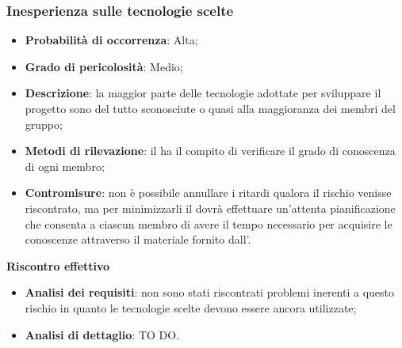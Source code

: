 		\subsubsection{Inesperienza sulle tecnologie scelte} %
		\label{ssub:inesperienza_sulle_tecnlogie_scelte}
			\begin{itemize}
				\item \textbf{Probabilità di occorrenza}: Alta;
				\item \textbf{Grado di pericolosità}: Medio;
				\item \textbf{Descrizione}: la maggior parte delle tecnologie adottate per sviluppare il progetto sono del tutto sconosciute o quasi alla maggioranza dei membri del gruppo;
				\item \textbf{Metodi di rilevazione}: il \roleProjectManager{} ha il compito di verificare il grado di conoscenza di ogni membro;
				\item \textbf{Contromisure}: non è possibile annullare i ritardi qualora il rischio venisse riscontrato, ma per minimizzarli il \roleProjectManager{} dovrà effettuare un'attenta pianificazione che consenta a ciascun membro di avere il tempo necessario per acquisire le conoscenze attraverso il materiale fornito dall'\roleAdministrator.
			\end{itemize}
		\noindent
		\textbf{Riscontro effettivo}
			\begin{itemize}
				\item \textbf{Analisi dei requisiti}: non sono stati riscontrati problemi inerenti a questo rischio in quanto le tecnologie scelte devono essere ancora utilizzate;
				\item \textbf{Analisi di dettaglio}: TO DO.
			\end{itemize}


